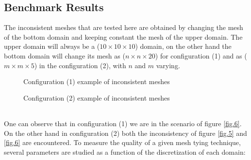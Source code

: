  \subsection{Benchmark Results}\label{ssec42}
 The inconsistent meshes that are tested here are obtained by changing the mesh of the bottom domain and keeping constant the mesh of the upper domain. The upper domain will always be a ($10\times10\times10$) domain, on the other hand the bottom domain will change its mesh as ($n\times n\times20$) for configuration (1) and as ($m \times m \times 5$) in the configuration (2), with $n$ and $m$ varying.
    \begin{figure}[!ht]
    \centering
      \caption{Configuration (1) example of inconsistent meshes}
      \label{fig.19}
    \end{figure}
    \begin{figure}[!ht]
    \centering
      \caption{Configuration (2) example of inconsistent meshes }
      \label{fig.20}
    \end{figure}
  \\
  One can observe that in configuration (1) we are in the scenario of figure \ref{fig.6}. On the other hand in configuration (2) both the inconsistency of figure \ref{fig.5} and \ref{fig.6} are encountered. 
   To measure the quality of a given mesh tying technique, several parameters are studied as a function of the discretization of each domain:

